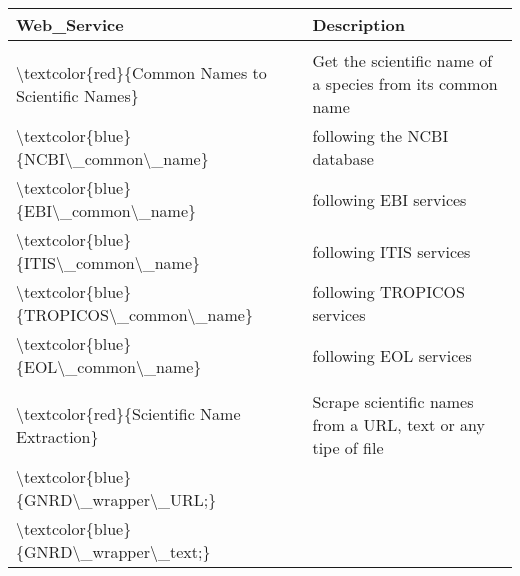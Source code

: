 \documentclass[border=1mm, preview]{standalone}
\begin{document}
\begingroup\fontsize{6}{8}\selectfont

\begin{tabu} to 
\toprule
\textbf{Web\_Service} & \textbf{Description}\\
\midrule
\addlinespace[0.5em]
\\
\textbackslash{}textcolor\{red\}\{Common Names to Scientific Names\} & Get the scientific name of a species from its common name\\

\hspace{1em}\textbackslash{}textcolor\{blue\}\{NCBI\textbackslash{}\_common\textbackslash{}\_name\} & following the NCBI database\\

\hspace{1em}\textbackslash{}textcolor\{blue\}\{EBI\textbackslash{}\_common\textbackslash{}\_name\} & following EBI services\\

\hspace{1em}\textbackslash{}textcolor\{blue\}\{ITIS\textbackslash{}\_common\textbackslash{}\_name\} & following ITIS services\\

\hspace{1em}\textbackslash{}textcolor\{blue\}\{TROPICOS\textbackslash{}\_common\textbackslash{}\_name\} & following TROPICOS services\\

\hspace{1em}\textbackslash{}textcolor\{blue\}\{EOL\textbackslash{}\_common\textbackslash{}\_name\} & following EOL services\\

\addlinespace[0.5em]
\\
\textbackslash{}textcolor\{red\}\{Scientific Name Extraction\} & Scrape scientific names from a URL, text or any tipe of file\\

\hspace{1em}\textbackslash{}textcolor\{blue\}\{GNRD\textbackslash{}\_wrapper\textbackslash{}\_URL;\} & \\

\hspace{1em}\textbackslash{}textcolor\{blue\}\{GNRD\textbackslash{}\_wrapper\textbackslash{}\_text;\} & \\


\end{tabu}
\end{document}
